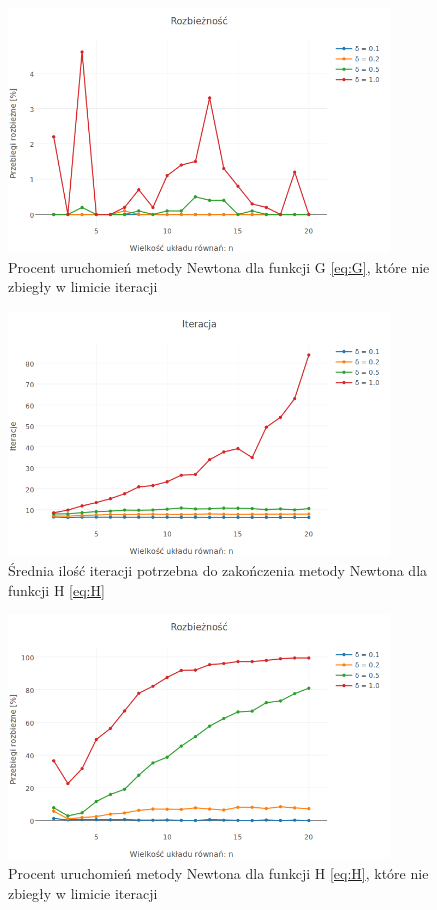\documentclass[11pt,wide]{mwart}
\begin{document}
\begin{figure}[h]
    \centering
    \includegraphics[width=0.9\textwidth]{avg_diversions_G}
    \caption{Procent uruchomień metody Newtona dla funkcji G \eqref{eq:G}, które nie zbiegły w limicie iteracji}
    \label{fig:avgdiversionsG}
\end{figure}
\begin{figure}[h]
    \centering
    \includegraphics[width=0.9\textwidth]{avg_iterations_H}
    \caption{Średnia ilość iteracji potrzebna do zakończenia metody Newtona dla funkcji H \eqref{eq:H}}
    \label{fig:avgiterationsH}
\end{figure}
\begin{figure}[h]
    \centering
    \includegraphics[width=0.9\textwidth]{avg_diversions_H}
    \caption{Procent uruchomień metody Newtona dla funkcji H \eqref{eq:H}, które nie zbiegły w limicie iteracji}
    \label{fig:avgdiversionsH}
\end{figure}
\end{document}
